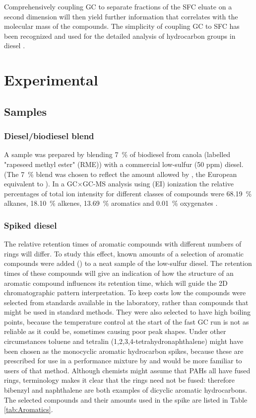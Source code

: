 Comprehensively coupling GC to separate fractions of the SFC eluate on a second
dimension will then yield further information that correlates with the molecular
mass of the compounds. The simplicity of coupling GC to SFC has been recognized
and used for the detailed analysis of hydrocarbon groups in diesel
\autocite{Pal1998}. 


\section{Experimental}

\subsection{Samples} 

\subsubsection{Diesel/biodiesel blend}
A sample was prepared by blending \SI{7}{\percent} of biodiesel from canola
(labelled "rapeseed methyl ester" (RME)) with a commercial low-sulfur (50 ppm)
diesel. (The \SI{7}{\percent} blend was chosen to reflect the amount allowed by
, the European equivalent to ). In a GC×GC-MS analysis
using  (EI) ionization the relative percentages of
total ion intensity for different classes of compounds were \SI{68.19}{\percent}
alkanes, \SI{18.10}{\percent} alkenes, \SI{13.69}{\percent} aromatics and
\SI{0.01}{\percent} oxygenates \autocite{Smit2015}.

\subsubsection{Spiked diesel}
The relative retention times of aromatic compounds with different numbers of
rings will differ. To study this effect, known amounts of a selection of
aromatic compounds were added () to a neat sample of the
low-sulfur diesel. The retention times of these compounds will give an
indication of how the structure of an aromatic compound influences its retention
time, which will guide the 2D chromatographic pattern interpretation. To keep
costs low the compounds were selected from standards available in the
laboratory, rather than compounds that might be used in standard methods. They
were also selected to have high boiling points, because the temperature control
at the start of the fast GC run is not as reliable as it could be, sometimes
causing poor peak shapes. Under other circumstances toluene and tetralin
(1,2,3,4-tetrahydronaphthalene) might have been chosen as the monocyclic
aromatic hydrocarbon spikes, because these are prescribed for use in a
performance mixture by  and would be more familiar to users of
that method. Although chemists might assume that PAHs all have fused rings,
 terminology makes it clear that the rings need not be fused:
therefore bibenzyl and naphthalene are both examples of dicyclic aromatic
hydrocarbons.
The selected compounds and their amounts used in the spike are listed in Table
\ref{tab:Aromatics}.

